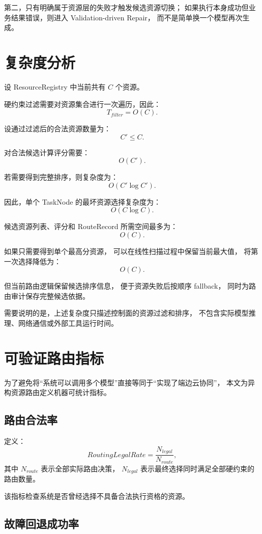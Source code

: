 \documentclass[UTF8,a4paper,12pt,oneside]{ctexbook}
\begin{document}
第二，只有明确属于资源层的失败才触发候选资源切换；
如果执行本身成功但业务结果错误，则进入 Validation-driven Repair，
而不是简单换一个模型再次生成。


\section{复杂度分析}

设 ResourceRegistry 中当前共有 $C$ 个资源。

硬约束过滤需要对资源集合进行一次遍历，因此：
\[
T_{filter}=O(C).
\]

设通过过滤后的合法资源数量为：
\[
C'\leq C.
\]

对合法候选计算评分需要：
\[
O(C').
\]

若需要得到完整排序，则复杂度为：
\[
O(C'\log C').
\]

因此，单个 TaskNode 的最坏资源选择复杂度为：
\[
O(C\log C).
\]

候选资源列表、评分和 RouteRecord 所需空间最多为：
\[
O(C).
\]

如果只需要得到单个最高分资源，
可以在线性扫描过程中保留当前最大值，
将第一次选择降低为：
\[
O(C).
\]

但当前路由逻辑保留候选排序信息，
便于资源失败后按顺序 fallback，
同时为路由审计保存完整候选依据。

需要说明的是，上述复杂度只描述控制面的资源过滤和排序，
不包含实际模型推理、网络通信或外部工具运行时间。


\section{可验证路由指标}

为了避免将“系统可以调用多个模型”直接等同于“实现了端边云协同”，
本文为异构资源路由定义机器可统计指标。


\subsection{路由合法率}

定义：
\[
RoutingLegalRate
=
\frac{N_{legal}}
{N_{route}},
\]
其中 $N_{route}$ 表示全部实际路由决策，
$N_{legal}$ 表示最终选择同时满足全部硬约束的路由数量。

该指标检查系统是否曾经选择不具备合法执行资格的资源。


\subsection{故障回退成功率}
\end{document}
